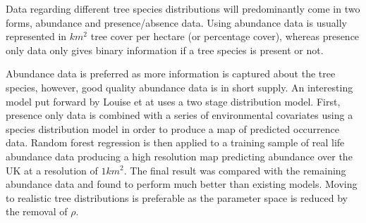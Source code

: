 

Data regarding different tree species distributions will predominantly come in two forms, abundance and presence/absence data. Using abundance data is usually represented in $km^2$ tree cover per hectare (or percentage cover), whereas presence only data only gives binary information if a tree species is present or not.

Abundance data is preferred as more information is captured about the tree species, however, good quality abundance data is in short supply. An interesting model put forward by Louise et at \cite{2STAGE} uses a two stage distribution model. First, presence only data is combined with a series of environmental covariates using a species distribution model in order to produce a map of predicted occurrence data. Random forest regression is then applied to a training sample of real life abundance data producing a high resolution map predicting abundance over the UK at a resolution of $1km^2$. The final result was compared with the remaining abundance data and found to perform much better than existing models. Moving to realistic tree distributions is preferable as the parameter space is reduced by the removal of $\rho$.

